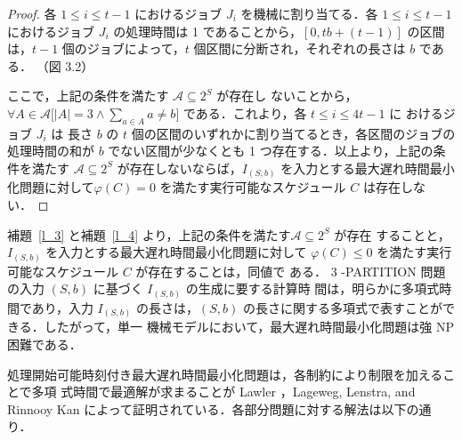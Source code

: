 \documentclass[12pt]{optlab-bachelor}
\begin{document}
\begin{proof}
  各 $1 \le i \le t - 1$ におけるジョブ $J_i$ を機械に割り当てる．各 $1 \le i \le t - 1$ におけるジョブ $J_i$ の処理時間は 1 であることから，$[0, tb + (t - 1)]$ の区間は，$t - 1$ 個のジョブによって，$t$ 個区間に分断され，それぞれの長さは $b$ である．
  （図 3.2）

  ここで，上記の条件を満たす $\mathcal{A} \subseteq 2^S$ が存在し
  ないことから，$\forall A \in \mathcal{A}\big[|A| = 3 \land \sum_{a \in
  A}a \neq b \big]$ である．これより，各 $t \le i \le 4t - 1$ に
  おけるジョブ $J_{i}$ は 長さ $b$ の $t$ 個の区間のいずれかに割り当てるとき，各区間のジョブの処理時間の和が $b$ でない区間が少なくとも 1 つ存在する．以上より，上記の条件を満たす $\mathcal{A} \subseteq 2^S$ が存在しないならば，$I_{(S,b)}$ を入力とする最大遅れ時間最小化問題に対して$\varphi(C) = 0$ を満たす実行可能なスケジュール $C$ は存在しない．
\end{proof}

補題~\ref{l_3} と補題~\ref{l_4} より，上記の条件を満たす$\mathcal{A} \subseteq 2^S$ が存在
することと，$I_{(S,b)}$ を入力とする最大遅れ時間最小化問題に対して
$\varphi(C) \le  0$
を満たす実行可能なスケジュール $C$ が存在することは，同値で
ある．
3 -PARTITION 問題の入力 $(S,b)$ に基づく $I_{(S,b)}$ の生成に要する計算時
間は，明らかに多項式時間であり，入力 $I_{(S,b)}$ の長さは，$(S, b)$
の長さに関する多項式で表すことができる．したがって，単一
機械モデルにおいて，最大遅れ時間最小化問題は強 NP 困難である．


処理開始可能時刻付き最大遅れ時間最小化問題は，各制約により制限を加えることで多項
式時間で最適解が求まることが Lawler \cite{EDD1}，Lageweg, Lenstra, and Rinnooy Kan \cite{EDD2} によって証明されている．各部分問題に対する解法は以下の通り．
\end{document}
